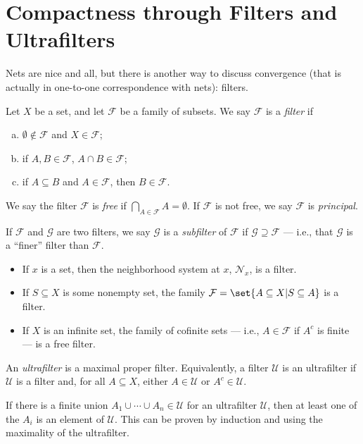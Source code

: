 \documentclass[11pt]{mypackage}
\begin{document}
\section{Compactness through Filters and Ultrafilters}%
Nets are nice and all, but there is another way to discuss convergence (that is actually in one-to-one correspondence with nets): filters.
\begin{definition}
  Let $X$ be a set, and let $\mathcal{F}$ be a family of subsets. We say $\mathcal{F}$ is a \textit{filter} if
  \begin{enumerate}[(a)]
    \item $\emptyset\notin \mathcal{F}$ and $X\in \mathcal{F}$;
    \item if $A,B\in \mathcal{F}$, $A\cap B\in \mathcal{F}$;
    \item if $A\subseteq B$ and $A\in \mathcal{F}$, then $B\in \mathcal{F}$.
  \end{enumerate}
  We say the filter $\mathcal{F}$ is \textit{free} if $\bigcap_{A\in \mathcal{F}}A = \emptyset$. If $\mathcal{F}$ is not free, we say $\mathcal{F}$ is \textit{principal}.\newline

  If $\mathcal{F}$ and $\mathcal{G}$ are two filters, we say $\mathcal{G}$ is a \textit{subfilter} of $\mathcal{F}$ if $\mathcal{G}\supseteq \mathcal{F}$ --- i.e., that $\mathcal{G}$ is a ``finer'' filter than $\mathcal{F}$.
\end{definition}
\begin{example}\hfill
  \begin{itemize}
    \item If $x$ is a set, then the neighborhood system at $x$, $\mathcal{N}_x$, is a filter.
    \item If $S\subseteq X$ is some nonempty set, the family $\mathcal{F} = \set{A\subseteq X | S\subseteq A}$ is a filter.
    \item If $X$ is an infinite set, the family of cofinite sets --- i.e., $A\in \mathcal{F}$ if $A^{c}$ is finite --- is a free filter.
  \end{itemize}
\end{example}
\begin{definition}
  An \textit{ultrafilter} is a maximal proper filter. Equivalently, a filter $\mathcal{U}$ is an ultrafilter if $\mathcal{U}$ is a filter and, for all $A\subseteq X$, either $A\in \mathcal{U}$ or $A^{c}\in \mathcal{U}$.
\end{definition}
  If there is a finite union $A_1\cup\cdots\cup A_n\in \mathcal{U}$ for an ultrafilter $\mathcal{U}$, then at least one of the $A_i$ is an element of $\mathcal{U}$. This can be proven by induction and using the maximality of the ultrafilter.
\end{document}
